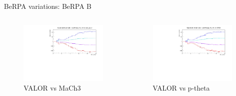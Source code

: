 \documentclass{beamer}
\begin{document}
\begin{frame}{BeRPA variations: BeRPA B}
	\centering
	\begin{columns}
		\begin{column}{0.5\paperwidth}
			\begin{figure}
				\includegraphics[page=8, trim={0cm 0cm 0cm 0cm}, clip, scale=0.35] {images/variations/valor_mach3/variations_prebanff_unosc_1Re}
				\caption*{VALOR vs MaCh3}
			\end{figure}
		\end{column}
		\begin{column}{0.5\paperwidth}
			\begin{figure}
				\includegraphics[page=18, trim={0cm 0cm 0cm 0cm}, clip, scale=0.35] {images/variations/valor_ptheta/variations_prebanff_unosc_1Re}
				\caption*{VALOR vs p-theta}
			\end{figure}
		\end{column}
	\end{columns}
\end{frame}
\end{document}
